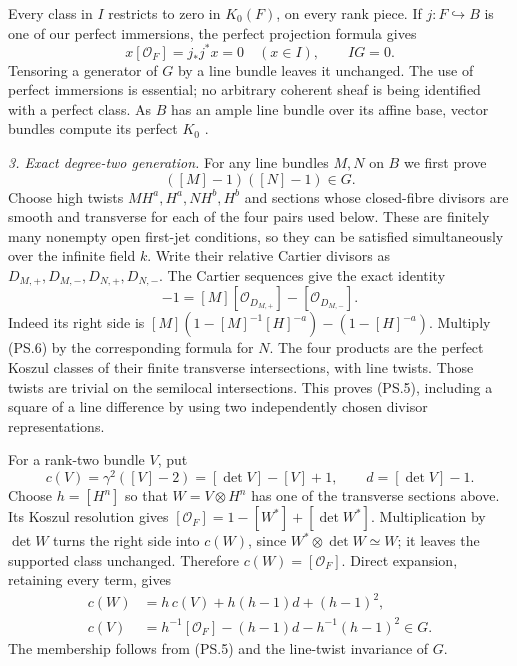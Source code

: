 Every class in $I$ restricts to zero in $K_0(F)$, on every
rank piece. If $j:F\hookrightarrow B$ is one of our perfect
immersions, the perfect projection formula gives
\begin{equation}
 x[\mathcal O_F]=j_*j^*x=0\quad(x\in I),
 \qquad IG=0.
                                                        \tag{PS.4}
\end{equation}
Tensoring a generator of $G$ by a line bundle leaves it
unchanged. The use of perfect immersions is essential;
no arbitrary coherent sheaf is being identified with a
perfect class. As $B$ has an ample line bundle over its
affine base, vector bundles compute its perfect $K_0$
\citep[Corollary 3.9 and Proposition 3.10]
{D_ThomasonTrobaugh1990}.

\emph{3. Exact degree-two generation.}
For any line bundles $M,N$ on $B$ we first prove
\begin{equation}
                         ([M]-1)([N]-1)\in G.
                                                        \tag{PS.5}
\end{equation}
Choose high twists $MH^a,H^a,NH^b,H^b$ and sections whose
closed-fibre divisors are smooth and transverse for each of
the four pairs used below. These are finitely many nonempty
open first-jet conditions, so they can be satisfied
simultaneously over the infinite field $k$.
Write their relative Cartier divisors as
$D_{M,+},D_{M,-},D_{N,+},D_{N,-}$.
The Cartier sequences give the exact identity
\begin{equation}
 [M]-1=[M][\mathcal O_{D_{M,+}}]
                         -[\mathcal O_{D_{M,-}}].
                                                        \tag{PS.6}
\end{equation}
Indeed its right side is
$[M](1-[M]^{-1}[H]^{-a})-(1-[H]^{-a})$.
Multiply (PS.6) by the corresponding formula for $N$.
The four products are the perfect Koszul classes of their
finite transverse intersections, with line twists.
Those twists are trivial on the semilocal intersections.
This proves (PS.5), including a square of a line difference
by using two independently chosen divisor representations.

For a rank-two bundle $V$, put
\[
 c(V)=\gamma^2([V]-2)=[\det V]-[V]+1,
 \qquad d=[\det V]-1.
\]
Choose $h=[H^n]$ so that $W=V\otimes H^n$ has one of the
transverse sections above. Its Koszul resolution gives
$[\mathcal O_F]=1-[W^*]+[\det W^*]$.
Multiplication by $\det W$ turns the right side into $c(W)$,
since $W^*\otimes\det W\simeq W$; it leaves the supported
class unchanged. Therefore $c(W)=[\mathcal O_F]$.
Direct expansion, retaining every term, gives
\begin{equation}
\begin{split}
 c(W)&=h\,c(V)+h(h-1)d+(h-1)^2,\\
 c(V)&=h^{-1}[\mathcal O_F]-(h-1)d-h^{-1}(h-1)^2\in G.
\end{split}                                               \tag{PS.7}
\end{equation}
The membership follows from (PS.5) and the line-twist
invariance of $G$.

